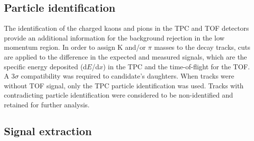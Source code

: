 \subsection{Particle identification}
\label{sec:pid_sel}
The identification of the charged kaons and pions in the TPC and TOF detectors provide an additional information for the background rejection in the low momentum region. In order to assign K and/or $\pi$ masses to the decay tracks, cuts are applied to the difference in the expected and measured signals, which are the specific energy deposited (d$E$/d$x$) in the TPC and the time-of-flight for the TOF. A 3$\sigma$ compatibility was required to \Dstar candidate's daughters. When tracks were without TOF signal, only the TPC particle identification was used. Tracks with contradicting particle identification were considered to be non-identified and retained for further analysis. 

\subsection{Signal extraction}
\label{sec:sign_extr}


